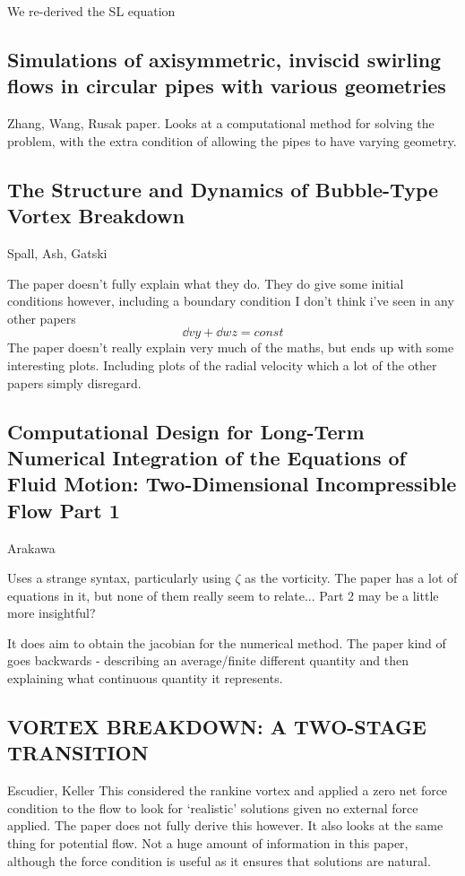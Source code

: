\documentclass{X:/Documents/Coding/Latex/myreport}
\begin{document}
We re-derived the SL equation

\subsection{Simulations of axisymmetric, inviscid swirling flows in circular pipes with various geometries}
Zhang, Wang, Rusak paper.
Looks at a computational method for solving the problem, with the extra condition of allowing the pipes to have varying geometry.



\subsection{The Structure and Dynamics of Bubble-Type Vortex Breakdown}
Spall, Ash, Gatski

The paper doesn't fully explain what they do. They do give some initial conditions however, including a boundary condition I don't think i've seen in any other papers
\[\dd vy + \dd wz = const\]
The paper doesn't really explain very much of the maths, but ends up with some interesting plots.
Including plots of the radial velocity which a lot of the other papers simply disregard.
\subsection{Computational Design for Long-Term Numerical Integration of the Equations of Fluid Motion: Two-Dimensional Incompressible Flow Part 1}
Arakawa

Uses a strange syntax, particularly using $\zeta$ as the vorticity.
The paper has a lot of equations in it, but none of them really seem to relate... Part 2 may be a little more insightful?

It does aim to obtain the jacobian for the numerical method. The paper kind of goes backwards - describing an average/finite different quantity and then explaining what continuous quantity it represents.
\subsection{VORTEX BREAKDOWN: A TWO-STAGE TRANSITION}
Escudier, Keller
This considered the rankine vortex and applied a zero net force condition to the flow to look for `realistic' solutions given no external force applied. The paper does not fully derive this however. 
It also looks at the same thing for potential flow. Not a huge amount of information in this paper, although the force condition is useful as it ensures that solutions are natural.
\end{document}
